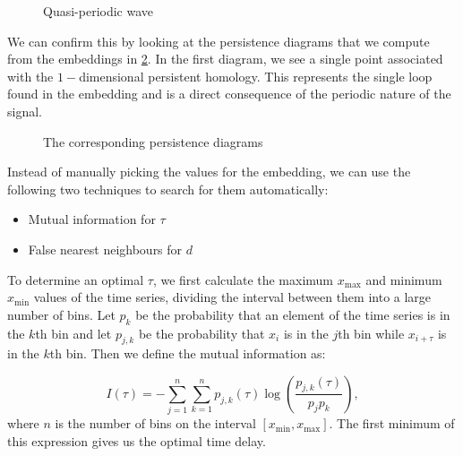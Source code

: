 \begin{figure}[h!]
  \centering
  \qquad
  \caption{Quasi-periodic wave}%
  \label{fig:nonperiodic_embedding}%
\end{figure}

We can confirm this by looking at the persistence diagrams that we compute from the embeddings in \ref{fig:embedding_diagrams}. In the first diagram, we see a single point associated with the $1-$dimensional persistent homology. This represents the single loop found in the embedding and is a direct consequence of the periodic nature of the signal.

\begin{figure}[h!]
  \centering
  \qquad
  \caption{The corresponding persistence diagrams}%
  \label{fig:embedding_diagrams}%
\end{figure}

Instead of manually picking the values for the embedding, we can use the following two techniques to search for them automatically:
\begin{itemize}
  \item Mutual information for $\tau$
  \item False nearest neighbours for $d$
\end{itemize}

To determine an optimal $\tau$, we first calculate the maximum $x_{\text{max}}$ and minimum $x_{\text{min}}$ values of the time series, dividing the interval between them into a large number of bins. Let $p_{k}$ be the probability that an element of the time series is in the $k$th bin and let $p_{j,k}$ be the probability that $x_{i}$ is in the $j$th bin while $x_{i+\tau}$ is in the $k$th bin. Then we define the mutual information as:

\begin{equation*}
  I(\tau) = -\sum_{j=1}^{n}\sum_{k=1}^{n}p_{j,k}(\tau)\log\left(\frac{p_{j,k}(\tau)}{p_{j}p_{k}}\right),
\end{equation*}
where $n$ is the number of bins on the interval $[x_{\text{min}}, x_{\text{max}}]$. The first minimum of this expression gives us the optimal time delay.

